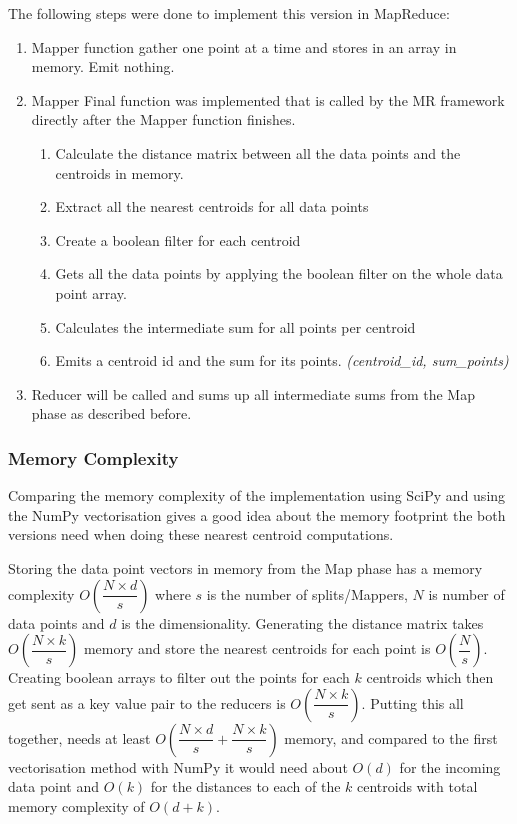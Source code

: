 The following steps were done to implement this version in MapReduce:
\begin{enumerate}
\item Mapper function gather one point at a time and stores in an array in memory. Emit nothing. 
\item Mapper Final function was implemented that is called by the MR framework directly after the Mapper function finishes.
\begin{enumerate}
	\item Calculate the distance matrix between all the data points and the centroids in memory.
	\item Extract all the nearest centroids for all data points
	\item Create a boolean filter for each centroid
	\item Gets all the data points by applying the boolean filter on the whole data point array.
	\item Calculates the intermediate sum for all points per centroid
	\item Emits a centroid id and the sum for its points. \textit{(centroid\_id, sum\_points)}
\end{enumerate} 
\item Reducer will be called and sums up all intermediate sums from the Map phase as described before. 
\end{enumerate}


\subsubsection{Memory Complexity}
Comparing the memory complexity of the implementation using SciPy and using the NumPy vectorisation gives a good idea about the memory footprint the both versions need when doing these nearest centroid computations. 

Storing the data point vectors in memory from the Map phase has a memory complexity $O(\dfrac{N \times d}{s})$ where $s$ is the number of splits/Mappers, $N$ is number of data points and $d$ is the dimensionality. Generating the distance matrix takes $O(\dfrac{N \times k}{s})$ memory and store the nearest centroids for each point is $O(\dfrac{N}{s})$. Creating boolean arrays to filter out the points for each $k$ centroids which then get sent as a key value pair to the reducers is $O(\dfrac{N \times k}{s})$. Putting this all together, needs at least $O(\dfrac{N \times d}{s} + \dfrac{N \times k}{s})$ memory, and compared to the first vectorisation method with NumPy it would need about $O(d)$ for the incoming data point and $O(k)$ for the distances to each of the $k$ centroids with total memory complexity of $O(d + k)$.


